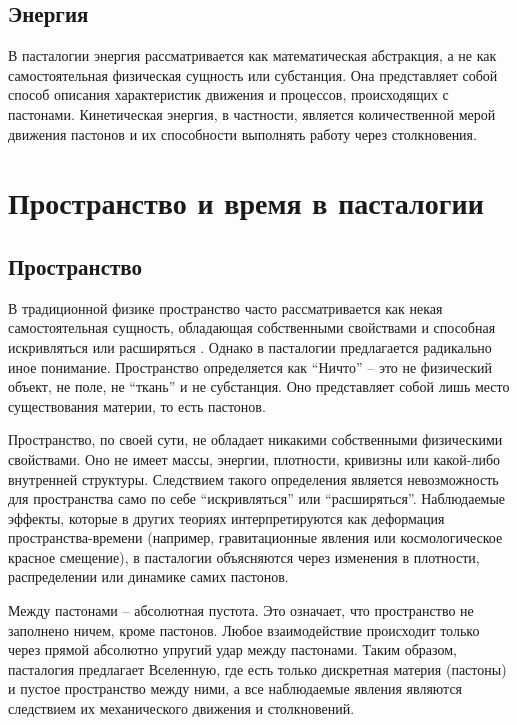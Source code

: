 \documentclass[pdflatex,sn-mathphys-num]{sn-jnl}
\begin{document}
\subsection{Энергия}\label{subsec:energy}

В пасталогии энергия рассматривается как математическая абстракция, а не как самостоятельная физическая сущность или субстанция. Она представляет собой способ описания характеристик движения и процессов, происходящих с пастонами. Кинетическая энергия, в частности, является количественной мерой движения пастонов и их способности выполнять работу через столкновения.

\section{Пространство и время в пасталогии}\label{sec:space-time}

\subsection{Пространство}\label{subsec:space}

В традиционной физике пространство часто рассматривается как некая самостоятельная сущность, обладающая собственными свойствами и способная искривляться или расширяться \cite{mtw1973}. Однако в пасталогии предлагается радикально иное понимание. Пространство определяется как ``Ничто'' -- это не физический объект, не поле, не ``ткань'' и не субстанция. Оно представляет собой лишь место существования материи, то есть пастонов.

Пространство, по своей сути, не обладает никакими собственными физическими свойствами. Оно не имеет массы, энергии, плотности, кривизны или какой-либо внутренней структуры. Следствием такого определения является невозможность для пространства само по себе ``искривляться'' или ``расширяться''. Наблюдаемые эффекты, которые в других теориях интерпретируются как деформация пространства-времени (например, гравитационные явления или космологическое красное смещение), в пасталогии объясняются через изменения в плотности, распределении или динамике самих пастонов.

Между пастонами -- абсолютная пустота. Это означает, что пространство не заполнено ничем, кроме пастонов. Любое взаимодействие происходит только через прямой абсолютно упругий удар между пастонами. Таким образом, пасталогия предлагает Вселенную, где есть только дискретная материя (пастоны) и пустое пространство между ними, а все наблюдаемые явления являются следствием их механического движения и столкновений.
\end{document}
